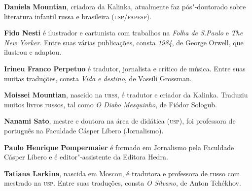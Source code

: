 \noindent\textbf{Daniela Mountian}, criadora da Kalinka, atualmente faz pós"-doutorado sobre literatura infantil russa e brasileira (\textsc{usp/fapesp}).

\noindent\textbf{Fido Nesti} é ilustrador e cartunista com trabalhos na \textit{Folha de S.Paulo} e \textit{The New Yorker}. Entre suas várias publicações, consta \textit{1984}, de George Orwell, que ilustrou e adaptou.

\noindent\textbf{Irineu Franco Perpetuo} é tradutor, jornalista e crítico de música. Entre suas muitas traduções, consta \textit{Vida e destino}, de Vassíli Grossman.

\noindent\textbf{Moissei Mountian}, nascido na \textsc{urss}, é tradutor e criador da Kalinka. Traduziu muitos livros russos, tal como \textit{O Diabo Mesquinho}, de Fiódor Sologub.

\noindent\textbf{Nanami Sato}, mestre e doutora na área de didática (\textsc{usp}), foi professora de português na Faculdade Cásper Líbero (Jornalismo).

\noindent\textbf{Paulo Henrique Pompermaier} é formado em Jornalismo pela Faculdade Cásper Líbero e é editor"-assistente da Editora Hedra.

\noindent\textbf{Tatiana Larkina}, nascida em Moscou, é tradutora e professora de russo com mestrado na \textsc{usp}. Entre suas traduções, consta \textit{O Silvano}, de Anton Tchékhov.

\endgroup

\pagebreak
\pagestyle{empty}
\movetooddpage
\pagestyle{empty}

